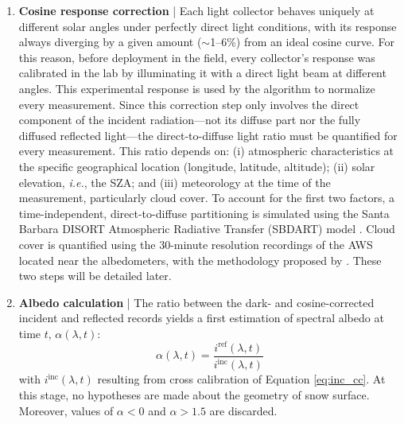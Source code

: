 \documentclass[11pt,a4paper]{article}
\newcommand{\ie}{\emph{i.e.}, }
\begin{document}
\begin{enumerate}[align=right,itemindent=2em,labelsep=4pt,labelwidth=1em,leftmargin=0pt,nosep]
	$i_{\mathrm{cal}}^{\mathrm{ref}}(\lambda)$ and $i_{\mathrm{cal}}^{\mathrm{inc}}(\lambda)$, their ratio $R_\mathrm{CC}(\lambda)$ is used to scale the incident spectral signal:
	:
	\begin{equation}\label{eq:inc_cc}
		i^{\mathrm{inc}}(\lambda, t) \leftarrow i^{\mathrm{inc}}(\lambda, t) R_\mathrm{CC}(\lambda), \qquad R_\mathrm{CC}(\lambda) = \frac{i_{\mathrm{cal}}^{\mathrm{ref}}(\lambda)}{i_{\mathrm{cal}}^{\mathrm{inc}}(\lambda)}
	\end{equation}
	\item \textbf{Cosine response correction} |
	Each light collector behaves uniquely at different solar angles under perfectly direct light conditions, with its response always diverging by a given amount ($\sim$1--6\%) from an ideal cosine curve. For this reason, before deployment in the field, every collector's response was calibrated in the lab by illuminating it with a direct light beam at different angles. This experimental response is used by the algorithm to normalize every measurement. Since this correction step only involves the direct component of the incident radiation---not its diffuse part nor the fully diffused reflected light---the direct-to-diffuse light ratio must be quantified for every measurement. This ratio depends on: (i) atmospheric characteristics at the specific geographical location (longitude, latitude, altitude); (ii) solar elevation, \ie the SZA; and (iii) meteorology at the time of the measurement, particularly cloud cover. To account for the first two factors, a time-independent, direct-to-diffuse partitioning is simulated using the Santa Barbara DISORT Atmospheric Radiative Transfer (SBDART) model \parencite{ricchiazziSBDARTResearchTeaching1998}. Cloud cover is quantified using the 30-minute resolution recordings of the AWS located near the albedometers, with the methodology proposed by \cite{martyClearskyIndexSeparate2000}. These two steps will be detailed later.
	\item \textbf{Albedo calculation} |
	The ratio between the dark- and cosine-corrected incident and reflected records yields a first estimation of spectral albedo at time $t$, $\alpha(\lambda, t)$:
	\begin{equation}\label{eq:alb1}
		\alpha(\lambda, t) = \frac{i^{\mathrm{ref}}(\lambda, t)}{i^{\mathrm{inc}}(\lambda, t)}
	\end{equation}
	with $i^{\mathrm{inc}}(\lambda, t)$ resulting from cross calibration of Equation \eqref{eq:inc_cc}. At this stage, no hypotheses are made about the geometry of snow surface. Moreover, values of $\alpha < 0$ and $\alpha > 1.5$ are discarded. 

\end{enumerate}
\end{document}
